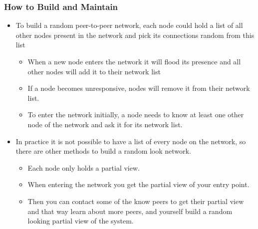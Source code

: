 \documentclass[11pt]{article}
\begin{document}
\subsubsection{How to Build and Maintain}
\label{sec:org7fca6b4}
\begin{itemize}
\item To build a random peer-to-peer network, each node could hold a list of all other nodes present in the network and pick its connections random from this list
\begin{itemize}
\item When a new node enters the network it will flood its presence and all other nodes will add it to their network list
\item If a node becomes unresponsive, nodes will remove it from their network list.
\item To enter the network initially, a node needs to know at least one other node of the network and ask it for its network list.
\end{itemize}

\item In practice it is not possible to have a list of every node on the network, so there are other methods to build a random look network.
\begin{itemize}
\item Each node only holds a partial view.
\item When entering the network you get the partial view of your entry point.
\item Then you can contact some of the know peers to get their partial view and that way learn about more peers, and yourself build a random looking partial view of the system.
\end{itemize}
\end{itemize}
\end{document}
